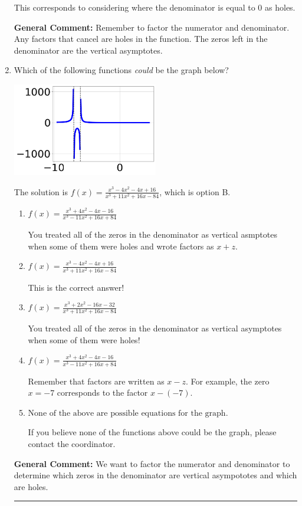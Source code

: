 \documentclass{extbook}[14pt]
\newcommand{\litem}[1]{\item #1

\rule{\textwidth}{0.4pt}}
\begin{document}
\begin{enumerate}
{\begin{enumerate}[label=\Alph*.]
This corresponds to considering where the denominator is equal to 0 as holes.
\end{enumerate}

\textbf{General Comment:} Remember to factor the numerator and denominator. Any factors that cancel are holes in the function. The zeros left in the denominator are the vertical asymptotes.
}
\litem{
Which of the following functions \textit{could} be the graph below?

\begin{center}
    \includegraphics[width=0.5\textwidth]{../Figures/identifyGraphOfRationalFunctionCopyA.png}
\end{center}




The solution is \( f(x)=\frac{x^{3} -4 x^{2} -4 x + 16}{x^{3} +11 x^{2} +16 x -84} \), which is option B.\begin{enumerate}[label=\Alph*.]
\item \( f(x)=\frac{x^{3} +4 x^{2} -4 x -16}{x^{3} -11 x^{2} +16 x + 84} \)

You treated all of the zeros in the denominator as vertical asmptotes when some of them were holes and wrote factors as $x+z$.
\item \( f(x)=\frac{x^{3} -4 x^{2} -4 x + 16}{x^{3} +11 x^{2} +16 x -84} \)

This is the correct answer!
\item \( f(x)=\frac{x^{3} +2 x^{2} -16 x -32}{x^{3} +11 x^{2} +16 x -84} \)

You treated all of the zeros in the denominator as vertical asymptotes when some of them were holes!
\item \( f(x)=\frac{x^{3} +4 x^{2} -4 x -16}{x^{3} -11 x^{2} +16 x + 84} \)

Remember that factors are written as $x-z$. For example, the zero $x=-7$ corresponds to the factor $x-(-7)$.
\item \( \text{None of the above are possible equations for the graph.} \)

If you believe none of the functions above could be the graph, please contact the coordinator.
\end{enumerate}

\textbf{General Comment:} We want to factor the numerator and denominator to determine which zeros in the denominator are vertical asympototes and which are holes.
}
\end{enumerate}
\end{document}
